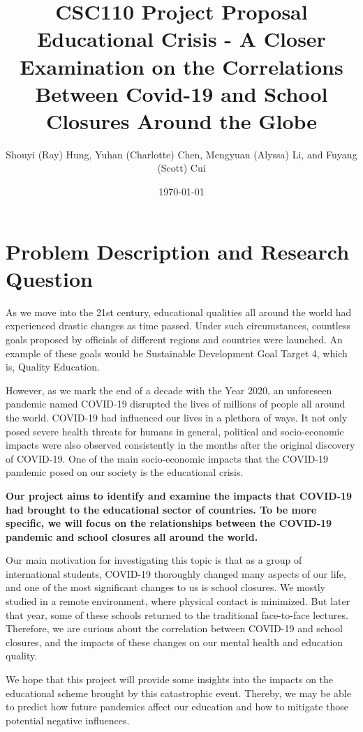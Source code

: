 \documentclass[fontsize=11pt]{article}
\title{CSC110 Project Proposal\\ Educational Crisis - A Closer Examination on the Correlations Between Covid-19 and School Closures Around the Globe}
\author{Shouyi (Ray) Hung, Yuhan (Charlotte) Chen, Mengyuan (Alyssa) Li, and Fuyang (Scott) Cui}
\date{\today}
\begin{document}
\maketitle

\section*{Problem Description and Research Question}

As we move into the 21st century, educational qualities all around the world had experienced drastic changes as time passed. Under such circumstances, countless goals proposed by officials of different regions and countries were launched. An example of these goals would be Sustainable Development Goal Target 4, which is, Quality Education.

However, as we mark the end of a decade with the Year 2020, an unforeseen pandemic named COVID-19 disrupted the lives of millions of people all around the world. COVID-19 had influenced our lives in a plethora of ways. It not only posed severe health threats for humans in general, political and socio-economic impacts were also observed consistently in the months after the original discovery of COVID-19. One of the main socio-economic impacts that the COVID-19 pandemic posed on our society is the educational crisis.

\textbf{Our project aims to identify and examine the impacts that COVID-19 had brought to the educational sector of countries. To be more specific, we will focus on the relationships between the COVID-19 pandemic and school closures all around the world.}

Our main motivation for investigating this topic is that as a group of international students, COVID-19 thoroughly changed many aspects of our life, and one of the most significant changes to us is school closures. We mostly studied in a remote environment, where physical contact is minimized. But later that year, some of these schools returned to the traditional face-to-face lectures. Therefore, we are curious about the correlation between COVID-19 and school closures, and the impacts of these changes on our mental health and education quality.

We hope that this project will provide some insights into the impacts on the educational scheme brought by this catastrophic event. Thereby, we may be able to predict how future pandemics affect our education and how to mitigate those potential negative influences.
\end{document}
